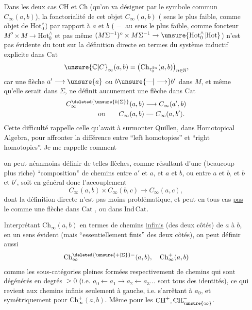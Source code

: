 Dans les deux cas $\mathrm{CH}$ et $\mathrm{Ch}$ (qu'on va désigner par le symbole commun $C_{\infty}(a,b)$), la fonctorialité de cet objet $C_{\infty}(a,b)$ (  sens le plus faible, comme objet de $\mathrm{Hot}_0^{\wedge}$) par rapport à $a$ et $b$ ($=$ au sens le plus faible, comme foncteur $M^o\times M\longrightarrow\mathrm{Hot}_0^{\wedge}$ et pas même $(M\Sigma^{-1})^o\times M\Sigma^{-1}\to\unsure{\mathrm{Hot}_0^{\wedge}|\mathrm{Hot}}$) n'est pas évidente du tout sur la définition directe  en termes du système inductif explicite dans $\mathrm{Cat}$
\[
\unsure{\mathbb C|C}_{\infty}(a,b)=\bigl(\mathrm{Ch}_{\tau_0^{2n}}(a,b)\bigr)_{n\in\mathbb N},
\]
car une flèche $a'\longrightarrow\unsure{a}$ ou $b\unsure{\text{---}|\longrightarrow}b'$ dans $M$, et même qu'elle serait dans $\Sigma$, ne définit aucunement une  flèche dans $\mathrm{Cat}$
\[
\begin{aligned}
C^{\deleted{\unsure{h|\Sigma}}}_{\infty}(a,b)&\longrightarrow C_{\infty}(a',b)\\
\text{ou}\qquad C_{\infty}(a,b)&\ \text{---}\ C_{\infty}(a,b').
\end{aligned}
\]
Cette difficulté rappelle celle qu'avait à surmonter Quillen, dans Homotopical Algebra, pour affronter la différence entre ``left homotopies'' et ``right homotopies''. Je me rappelle comment

on peut néanmoins définir de telles flèches, comme résultant d'une   (beaucoup plus riche)  ``composition'' de chemins entre $a'$ et $a$, et $a$ et $b$, ou entre $a$ et $b$, et $b$ et $b'$, soit en général donc l'accouplement
\[
C_{\infty}(a,b)\times C_{\infty}(b,c)\longrightarrow C_{\infty}(a,c),
\]
dont la définition directe n'est pas moins problématique, et  peut en tous cas \uline{pas} le   comme une flèche dans $\mathrm{Cat}$ , ou dans $\mathrm{Ind}\,\mathrm{Cat}$.

 Interprétant    $\mathrm{Ch}_{\infty}(a,b)$ en termes de chemins \uline{infinis} (des deux côtés) de $a$ à $b$, en un sens évident (mais ``essentiellement finis'' des deux côtés), on peut définir aussi
\[
\mathrm{Ch}_{\infty}^{\deleted{\unsure{+|\Sigma}}-}(a,b),\quad\mathrm{Ch}_{\infty}^{+}(a,b)
\]
comme les sous-catégories pleines formées  respectivement de chemins qui sont  dégénérés en degrés $\geq0$ (i.e. $a_0\leftarrow a_1\to a_2\leftarrow a_3\ldots$ sont tous des identités), ce qui revient aux chemins infinis seulement à gauche, i.e. s'arrêtant à $a_0$, et symétriquement pour $\mathrm{Ch}_{\infty}^{+}(a,b)$. Même  pour les $\mathrm{CH}^{+},\mathrm{CH}^{-}_{\unsure{\infty}}$.

